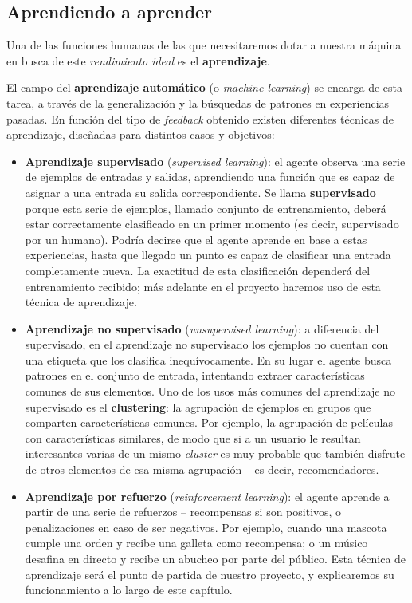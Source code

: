 \subsection{Aprendiendo a aprender}
Una de las funciones humanas de las que necesitaremos dotar a nuestra máquina en busca de este \textit{rendimiento ideal} es el \textbf{aprendizaje}.

El campo del \textbf{aprendizaje automático} (o \textit{machine learning}) se encarga de esta tarea, a través de la generalización y la búsquedas de patrones en experiencias pasadas. En función del tipo de \textit{feedback} obtenido existen diferentes técnicas de aprendizaje, diseñadas para distintos casos y objetivos:
\begin{itemize}
    \item \textbf{Aprendizaje supervisado} (\textit{supervised learning}): el agente observa una serie de ejemplos de entradas y salidas, aprendiendo una función que es capaz de asignar a una entrada su salida correspondiente. Se llama \textbf{supervisado} porque esta serie de ejemplos, llamado conjunto de entrenamiento, deberá estar correctamente clasificado en un primer momento (es decir, supervisado por un humano). Podría decirse que el agente aprende en base a estas experiencias, hasta que llegado un punto es capaz de clasificar una entrada completamente nueva. La exactitud de esta clasificación dependerá del entrenamiento recibido; más adelante en el proyecto haremos uso de esta técnica de aprendizaje.
    \item \textbf{Aprendizaje no supervisado} (\textit{unsupervised learning}): a diferencia del supervisado, en el aprendizaje no supervisado los ejemplos no cuentan con una etiqueta que los clasifica inequívocamente. En su lugar el agente busca patrones en el conjunto de entrada, intentando extraer características comunes de sus elementos. Uno de los usos más comunes del aprendizaje no supervisado es el \textbf{clustering}: la agrupación de ejemplos en grupos que comparten características comunes. Por ejemplo, la agrupación de películas con características similares, de modo que si a un usuario le resultan interesantes varias de un mismo \textit{cluster} es muy probable que también disfrute de otros elementos de esa misma agrupación – es decir, recomendadores.
    \item \textbf{Aprendizaje por refuerzo} (\textit{reinforcement learning}): el agente aprende a partir de una serie de refuerzos – recompensas si son positivos, o penalizaciones en caso de ser negativos. Por ejemplo, cuando una mascota cumple una orden y recibe una galleta como recompensa; o un músico desafina en directo y recibe un abucheo por parte del público. Esta técnica de aprendizaje será el punto de partida de nuestro proyecto, y explicaremos su funcionamiento a lo largo de este capítulo.
\end{itemize}


